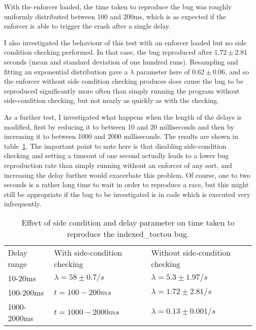 With the enforcer loaded, the time taken to reproduce the bug was
roughly uniformly distributed between 100 and 200ms, which is as
expected if the enforcer is able to trigger the crash after a single
delay. 

I also investigated the behaviour of this test with an enforcer loaded
but no side condition checking performed.  In that case, the bug
reproduced after $1.72 \pm 2.81$ seconds (mean and standard deviation
of one hundred runs).  Resampling and fitting an exponential
distribution gave a $\lambda$ parameter here of $0.62 \pm 0.06$, and
so the enforcer without side condition checking produces does cause
the bug to be reproduced significantly more often than simply running
the program without side-condition checking, but not nearly as quickly
as with the checking.

As a further test, I investigated what happens when the length of the
delays is modified, first by reducing it to between 10 and 20
milliseconds and then by increasing it to between 1000 and 2000
milliseconds.  The results are shown in
table~\ref{table:eval:indexedtoctou:delay}.  The important point to
note here is that disabling side-condition checking and setting a
timeout of one second actually leads to a lower bug reproduction rate
than simply running without an enforcer of any sort, and increasing
the delay further would exacerbate this problem.  Of course, one to
two seconds is a rather long time to wait in order to reproduce a
race, but this might still be appropriate if the bug to be
investigated is in code which is executed very infrequently.

\begin{table}
\begin{tabular}{lll}
Delay range  & With side-condition checking          & Without side-condition checking \\
10-20ms      & $\lambda = 58 \pm 0.7/s$              & $\lambda = 5.3 \pm 1.97/s$ \\
100-200ms    & $t = 100 - 200ms$                     & $\lambda = 1.72 \pm 2.81/s$ \\
1000-2000ms  & $t = 1000 - 2000ms$                   & $\lambda = 0.13 \pm 0.001/s$ \\
\end{tabular}
\caption{Effect of side condition and delay parameter on time taken to
  reproduce the indexed\_toctou bug.}  
\label{table:eval:indexedtoctou:delay}
\end{table}

